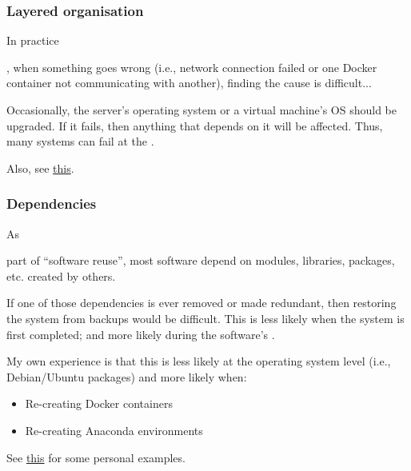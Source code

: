 \documentclass[11pt,aspectratio=43,ignorenonframetext,t]{beamer}
\begin{document}
\begin{frame}

\frametitle{Layered organisation}

\hypertarget{slide:layered}{In practice}, when something goes wrong (i.e., network connection failed or one Docker container not communicating with another), finding the cause is difficult...
\vs

Occasionally, the server's operating system or a virtual machine's OS should be upgraded.  If it fails, then anything that depends on it will be affected.  Thus, many systems can fail at the {}.
\vs

Also, see {\hyperlink{slide:eol}{this}}.

\end{frame}



\begin{frame}

\frametitle{Dependencies}

\hypertarget{slide:dependencies}{As} part of ``software reuse'', most software depend on modules, libraries, packages, etc. created by others.
\vs

If one of those dependencies is ever removed or made redundant, then restoring the system from backups would be difficult.  This is less likely when the system is first completed; and more likely during the software's {}.
\vs

My own experience is that this is less likely at the operating system level (i.e., Debian/Ubuntu packages) and more likely when:
\begin{itemize}
  \item Re-creating Docker containers
  \item Re-creating Anaconda environments
\end{itemize}

See {\hyperlink{slide:removedpkgs}{this}} for some personal examples.

\end{frame}
\end{document}
